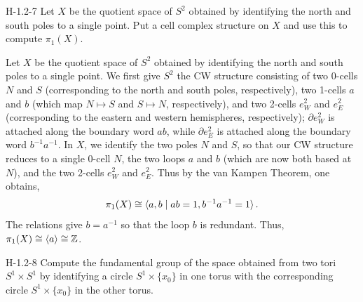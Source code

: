 \documentclass{article}
\begin{document}
	\begin{prb}{H-1.2-7}
		Let $X$ be the quotient space of $S^2$ obtained by identifying the north and south poles to a single point. Put a cell complex structure on $X$ and use this to compute $\pi_{1}(X)$. 
	\end{prb}
	Let $X$ be the quotient space of $S^2$ obtained by identifying the north and south poles to a single point. We first give $S^2$ the CW structure consisting of two 0-cells $N$ and $S$ (corresponding to the north and south poles, respectively), two 1-cells $a$ and $b$ (which map $N \mapsto S$ and $S \mapsto N$, respectively), and two 2-cells $e^{2}_{W}$ and $e^{2}_{E}$ (corresponding to the eastern and western hemispheres, respectively); $\partial e^{2}_{W}$ is attached along the boundary word $ab$, while $\partial e^{2}_{E}$ is attached along the boundary word $b^{-1}a^{-1}$. In $X$, we identify the two poles $N$ and $S$, so that our CW structure reduces to a single 0-cell $N$, the two loops $a$ and $b$ (which are now both based at $N$), and the two 2-cells $e^{2}_{W}$ and $e^{2}_{E}$. Thus by the van Kampen Theorem, one obtains, 
	\begin{equation*}
		\pi_{1}(X) \cong \braket{a, b \mid ab = 1, b^{-1}a^{-1} =1}. 
	\end{equation*}
	The relations give $b = a^{-1}$ so that the loop $b$ is redundant. Thus, $\pi_{1}(X) \cong \braket{a} \cong \mathbb{Z}$. 
	
	\begin{prb}{H-1.2-8}
		Compute the fundamental group of the space obtained from two tori $S^{1} \times S^{1}$ by identifying a circle $S^{1} \times \{x_0\}$ in one torus with the corresponding circle $S^{1} \times \{x_0\}$ in the other torus. 
	\end{prb}
	
\end{document}
